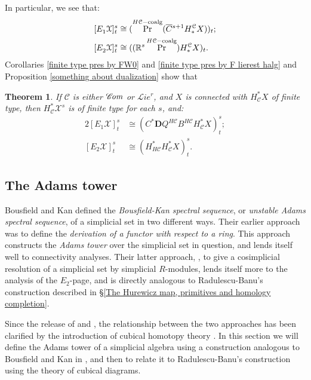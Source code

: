 \documentclass[11pt]{amsart} \renewcommand{\baselinestretch}{1.2}
\theoremstyle{plain}
\newtheorem{thm}{Theorem}[section] %
\numberwithin{equation}{section} %
\theoremstyle{plain}
\newtheorem{thm}{Theorem}[chapter] %
\numberwithin{equation}{chapter} %
\DeclareMathOperator{\Prim}{Pr}
\newcommand{\scrL}{\mathscr{L}}
\newcommand{\scrC}{\mathscr{C}}
\newcommand{\calx}{\mathcal{X}}
\newcommand{\calc}{\mathcal{C}}
\newcommand{\HA}[1]{H#1}
\newcommand{\HC}[1]{H#1\mathrm{-coalg}}
\newcommand{\algs}{{\scrC\!\textit{\normalfont\textit{om}}}}
\newcommand{\restliealgs}{{\scrL\!\textit{ie}^\textit{r}}}
\newcommand{\algcat}{{\calc}}%
\newcommand{\Edownup}[5]{[E_{#1}^{#2}#3]^{#4}_{#5}}
\newcommand{\dual}{\mathbf{D}}
\newcommand{\SubsectionOrSection}[1]{\subsection{#1}}
\begin{document}
\begin{Bousfield-Kan spectral sequence}
In particular, we see that:
\begin{alignat*}{2}
\Edownup{1}{}{\calx}{s}{t}&\cong (\Prim^{\HC{\calc}}(\smash{\overline{C}}^{s+1}H_*^{\algcat}X))_{t};\\
\Edownup{2}{}{\calx}{s}{t}&\cong((\mathbb{R}^s\Prim^{\HC{\calc}})H_*^{\algcat}X)_t.
\end{alignat*}
Corollaries \ref{finite type pres by FW0} and \ref{finite type pres by F lierest halg} and Proposition \ref{something about dualization} show that
\begin{thm}
\label{identify E2 with derived Q}
If $\algcat$ is either $\algs$ or $\restliealgs$, and $X$ is connected with $H^*_\calc X$  of finite type, then $H^*_\calc\calx^s$ is of finite type for each $s$, and:
\begin{alignat*}{2}
\Edownup{1}{}{\calx}{s}{t}&\cong (C^*\dual Q^{\HA{\algcat}} B^{\HA{\algcat}} H^*_{\algcat}X)^{s}_{t};\\
\Edownup{2}{}{\calx}{s}{t}&\cong (H^*_{\HA{\algcat}}H^*_{\algcat}X)^{s}_{t}.
\end{alignat*}
\end{thm}





\SubsectionOrSection{The Adams tower}\label{sec:derWRTab}\label{sec:relnWithRB}
Bousfield and Kan defined the \emph{Bousfield-Kan spectral sequence}, or \emph{unstable Adams spectral sequence}, of a simplicial set in two different ways. Their earlier approach \cite{BK_pairings.pdf} was to define the \emph{derivation of a functor with respect to a ring}. This approach constructs the \emph{Adams tower} over the simplicial set in question, and lends itself well to connectivity analyses. Their latter approach, \cite{BousKanSSeq.pdf}, to give a cosimplicial resolution of a simplicial set by simplicial $R$-modules, lends itself more to the analysis of the $E_2$-page, and is directly analogous to Radulescu-Banu's construction described in \S\ref{The Hurewicz map, primitives and homology completion}.

Since the release of \cite{BK_pairings.pdf} and \cite{BousKanSSeq.pdf}, the relationship between the two approaches has been clarified by the introduction of cubical homotopy theory \cite{GoodwillieCalcII}. In this section we will define the Adams tower of a simplicial algebra using a construction analogous to Bousfield and Kan in \cite{BK_pairings.pdf}, and then to relate it to Radulescu-Banu's construction using the theory of cubical diagrams. 



\end{Bousfield-Kan spectral sequence}
\end{document}
